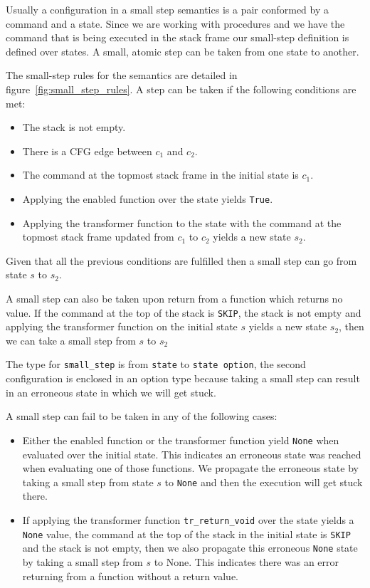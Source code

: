 Usually a configuration in a small step semantics is a pair conformed by a command and a state.
Since we are working with procedures and we have the command that is being executed in the stack frame our small-step definition is defined over states.
A small, atomic step can be taken from one state to another.

The small-step rules for the semantics are detailed in figure~\ref{fig:small_step_rules}.
A step can be taken if the following conditions are met:

\begin{itemize}
  \item{The stack is not empty.}
  \item{There is a CFG edge between $c_{1}$ and $c_{2}$.}
  \item{The command at the topmost stack frame in the initial state is $c_{1}$.}
  \item{Applying the enabled function over the state yields \verb|True|.}
  \item{Applying the transformer function to the state with the command at the topmost stack frame updated from $c_{1}$ to $c_{2}$ yields a new state $s_{2}$.}
\end{itemize}

Given that all the previous conditions are fulfilled then a small step can go from state $s$ to $s_{2}$.

A small step can also be taken upon return from a function which returns no value.
If the command at the top of the stack is \verb|SKIP|, the stack is not empty and applying the transformer function on the initial state $s$ yields a new state $s_{2}$, then we can take a small step from $s$ to $s_{2}$

The type for \verb|small_step| is from \verb|state| to \verb|state option|, the second configuration is enclosed in an option type because taking a small step can result in an erroneous state in which we will get stuck.

A small step can fail to be taken in any of the following cases:

\begin{itemize}
  \item{Either the enabled function or the transformer function yield \verb|None| when evaluated over the initial state.
  This indicates an erroneous state was reached when evaluating one of those functions.
  We propagate the erroneous state by taking a small step from state $s$ to \verb|None| and then the execution will get stuck there.}
  \item{If applying the transformer function \verb|tr_return_void| over the state yields a \verb|None| value, the command at the top of the stack in the initial state is \verb|SKIP| and the stack is not empty, then we also propagate this erroneous \verb|None| state by taking a small step from $s$ to None.
  This indicates there was an error returning from a function without a return value.}
\end{itemize}


